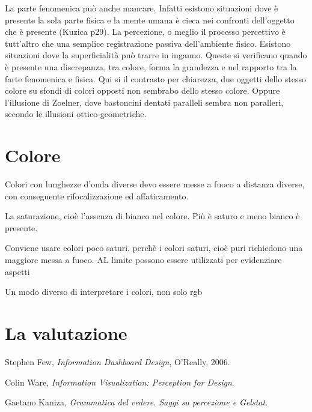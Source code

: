 \documentclass{ium}
\begin{document}
La parte fenomenica può anche mancare. Infatti esistono situazioni dove è presente la sola parte fisica e la mente umana è cieca nei confronti dell'oggetto che è presente (Kuzica p29).  
La percezione, o meglio il processo percettivo è tutt'altro che una semplice registrazione passiva dell'ambiente fisico. Esistono situazioni dove la superficialità può trarre in inganno. Queste si verificano quando è presente una discrepanza, tra colore, forma la grandezza e nel rapporto tra la farte fenomenica e fisica. Qui si il contrasto per chiarezza, due oggetti dello stesso colore su sfondi di colori opposti non sembrabo dello stesso colore. Oppure l'illusione di Zoelner, dove bastoncini dentati paralleli sembra non paralleri, secondo le illusioni ottico-geometriche.

\section{Colore}

Colori con lunghezze d'onda diverse devo essere messe a fuoco a distanza diverse, con conseguente rifocalizzazione ed affaticamento.

La saturazione, cioè l'assenza di bianco nel colore. Più è saturo e meno bianco è presente.

Conviene usare colori poco saturi, perchè i colori saturi, cioè puri richiedono una maggiore messa a fuoco. AL limite possono essere utilizzati per evidenziare aspetti

Un modo diverso di interpretare i colori, non solo rgb



\section{La valutazione}




%
%

\begin{thebibliography}{99}

  {\sc Stephen Few},
  {\em Information Dashboard Design},
  O'Really, 2006.

  {\sc Colin Ware},
  {\em Information Visualization: Perception for Design}.

  {\sc Gaetano Kaniza},
  {\em Grammatica del vedere. Saggi su percezione e Gelstat}.



\end{thebibliography}
\end{document}
